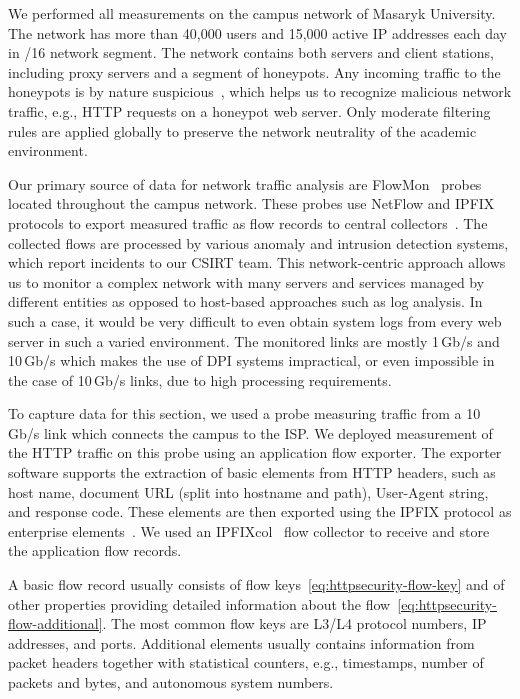 We performed all measurements on the campus network of Masaryk University. The network has more than 40,000 users and 15,000 active IP addresses each day in /16 network segment. The network contains both servers and client stations, including proxy servers and a segment of honeypots. Any incoming traffic to the honeypots is by nature suspicious~\cite{Provos-2007-Virtual}, which helps us to recognize malicious network traffic, e.g., HTTP requests on a honeypot web server. Only moderate filtering rules are applied globally to preserve the network neutrality of the academic environment.

Our primary source of data for network traffic analysis are FlowMon~\cite{FlowmonNetworks--Flowmon} probes located throughout the campus network. These probes use NetFlow and IPFIX protocols to export measured traffic as flow records to central collectors~\cite{Hofstede-2014-Flow}. The collected flows are processed by various anomaly and intrusion detection systems, which report incidents to our CSIRT team. This network-centric approach allows us to monitor a complex network with many servers and services managed by different entities as opposed to host-based approaches such as log analysis. In such a case, it would be very difficult to even obtain system logs from every web server in such a varied environment. The monitored links are mostly 1\,Gb/s and 10\,Gb/s which makes the use of DPI systems impractical, or even impossible in the case of 10\,Gb/s links, due to high processing requirements.

To capture data for this section, we used a probe measuring traffic from a 10\,Gb/s link which connects the campus to the ISP. We deployed measurement of the HTTP traffic on this probe using an application flow exporter. The exporter software supports the extraction of basic elements from HTTP headers, such as host name, document URL (split into hostname and path), User-Agent string, and response code. These elements are then exported using the IPFIX protocol as enterprise elements~\cite{rfc7011}. We used an IPFIXcol~\cite{Velan-2012-Flow} flow collector to receive and store the application flow records.

A basic flow record usually consists of flow keys~\eqref{eq:httpsecurity-flow-key} and of other properties providing detailed information about the flow~\eqref{eq:httpsecurity-flow-additional}. The most common flow keys are L3/L4 protocol numbers, IP addresses, and ports. Additional elements usually contains information from packet headers together with statistical counters, e.g., timestamps, number of packets and bytes, and autonomous system numbers.

